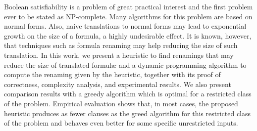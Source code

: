 Boolean satisfiability is a problem of great practical interest and the first problem ever to be stated as NP-complete. Many algorithms for this problem are based on normal forms. Also, naive translations to normal forms may lead to exponential growth on the size of a formula, a highly undesirable effect. It is known, however, that techniques such as formula renaming may help reducing the size of such translation. In this work, we present a heuristic to find renamings that may reduce the size of translated formul\ae \; and a dynamic programming algorithm to compute the renaming given by the heuristic, together with its proof of correctness, complexity analysis, and experimental results. We also present comparison results with a greedy algorithm which is optimal for a restricted class of the problem. Empirical evaluation shows that, in most cases, the proposed heuristic produces as fewer clauses as the greed algorithm for this restricted class of the problem and behaves even better for some specific unrestricted inputs.
